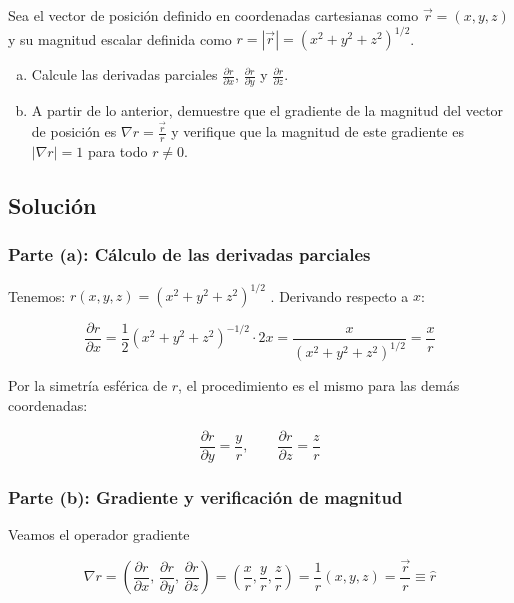 \documentclass[12pt, letterpaper]{article}
\begin{document}
Sea el vector de posición definido en coordenadas cartesianas como $\vec{r} = (x, y, z)$ y su
magnitud escalar definida como $r = |\vec{r}| = (x^2 + y^2 + z^2)^{1/2}$.

\begin{enumerate}[a.]
    \item Calcule las derivadas parciales $\frac{\partial r}{\partial x}$,
          $\frac{\partial r}{\partial y}$ y $\frac{\partial r}{\partial z}$.
    \item A partir de lo anterior, demuestre que el gradiente de la magnitud del vector de
          posición es $\nabla r = \frac{\vec{r}}{r}$ y verifique que la magnitud de este
          gradiente es $|\nabla r| = 1$ para todo $r \neq 0$.
\end{enumerate}

\subsection{Solución}

\subsubsection*{Parte (a): Cálculo de las derivadas parciales}

Tenemos: $r(x,y,z) = (x^2+y^2+z^2)^{1/2}$ . Derivando respecto a $x$:

$$
\frac{\partial r}{\partial x}
    = \frac{1}{2}(x^2+y^2+z^2)^{-1/2}\cdot 2x
    = \frac{x}{(x^2+y^2+z^2)^{1/2}}
    = \frac{x}{r}
$$

Por la simetría esférica de $r$, el procedimiento es el mismo para las demás
coordenadas:

$$
\frac{\partial r}{\partial y} = \frac{y}{r}, \qquad
\frac{\partial r}{\partial z} = \frac{z}{r}
$$

\subsubsection*{Parte (b): Gradiente y verificación de magnitud}

Veamos el operador gradiente

$$
\nabla r
    = \left(\frac{\partial r}{\partial x},\,
            \frac{\partial r}{\partial y},\,
            \frac{\partial r}{\partial z}\right)
    = \left(\frac{x}{r},\frac{y}{r},\frac{z}{r}\right)
    = \frac{1}{r}(x,y,z)
    = \frac{\vec{r}}{r} \equiv \hat{r}
$$
\end{document}
